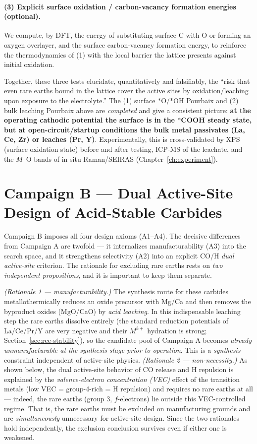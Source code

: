 \documentclass[11pt,a4paper]{report}
\begin{document}
\paragraph{(3) Explicit surface oxidation / carbon-vacancy formation energies (optional).} We compute, by DFT, the energy of substituting surface C
with O or forming an oxygen overlayer, and the surface carbon-vacancy formation energy, to reinforce the thermodynamics of (1) with the local barrier the lattice
presents against initial oxidation.

Together, these three tests elucidate, quantitatively and falsifiably, the ``risk that even rare earths bound in the lattice cover the active sites by
oxidation/leaching upon exposure to the electrolyte.'' The (1) surface $*$O/$*$OH Pourbaix and (2) bulk leaching Pourbaix above are \emph{completed}
and give a consistent picture: \textbf{at the operating cathodic potential the surface is in the $*$COOH steady state, but at open-circuit/startup
conditions the bulk metal passivates (La, Ce, Zr) or leaches (Pr, Y)}. Experimentally, this is cross-validated by XPS (surface
oxidation state) before and after testing, ICP-MS of the leachate, and the $M$--O bands of in-situ Raman/SEIRAS (Chapter~\ref{ch:experiment}).

\section{Campaign B --- Dual Active-Site Design of Acid-Stable Carbides}
\label{sec:campaignB}\label{sec:ree-free}
Campaign B imposes all four design axioms (A1--A4). The decisive differences from Campaign A are twofold --- it internalizes manufacturability (A3)
into the search space, and it strengthens selectivity (A2) into an explicit CO/H \emph{dual active-site} criterion.
The rationale for excluding rare earths rests on \emph{two independent propositions}, and it is important to keep them separate.

\emph{(Rationale 1 --- manufacturability.)} The synthesis route for these carbides metallothermically reduces an oxide precursor with Mg/Ca and then removes the
byproduct oxides (MgO/CaO) by \emph{acid leaching}. In this indispensable leaching step the rare earths dissolve entirely
(the standard reduction potentials of La/Ce/Pr/Y are very negative and their $M^{3+}$ hydration is strong; Section~\ref{sec:ree-stability}), so the
candidate pool of Campaign A becomes \emph{already unmanufacturable at the synthesis stage prior to operation}. This is a \emph{synthesis}
constraint independent of active-site physics. \emph{(Rationale 2 --- non-necessity.)} As shown below, the dual active-site behavior of CO release and H
repulsion is explained by the \emph{valence-electron concentration (VEC)} effect of the transition metals (low VEC = group-4-rich = H repulsion) and requires
no rare earths at all --- indeed, the rare earths (group 3, $f$-electrons) lie outside this VEC-controlled regime. That is, the rare earths must be excluded
on manufacturing grounds and are \emph{simultaneously} unnecessary for active-site design. Since the two rationales hold independently, the exclusion
conclusion survives even if either one is weakened.
\end{document}
